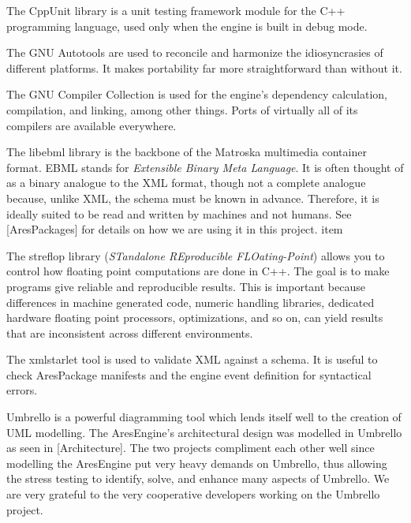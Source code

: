 
\startitemize[4]
\setupwhitespace[big]

The CppUnit library is a unit testing framework module for the C++ programming language, used only when the engine is built in debug mode.


The GNU Autotools are used to reconcile and harmonize the idiosyncrasies of different platforms. It makes portability far more straightforward than without it.


The GNU Compiler Collection is used for the engine's dependency calculation, compilation, and linking, among other things. Ports of virtually all of its compilers are available everywhere.


The libebml library is the backbone of the Matroska multimedia container format. EBML stands for {\it Extensible Binary Meta Language}. It is often thought of as a binary analogue to the XML format, though not a complete analogue because, unlike XML, the schema must be known in advance. Therefore, it is ideally suited to be read and written by machines and not humans. See [AresPackages] for details on how we are using it in this project.
item

The streflop library ({\it STandalone REproducible FLOating-Point}) allows you to control how floating point computations are done in C++. The goal is to make programs give reliable and reproducible results. This is important because differences in machine generated code, numeric handling libraries, dedicated hardware floating point processors, optimizations, and so on, can yield results that are inconsistent across different environments.


The xmlstarlet tool is used to validate XML against a schema. It is useful to check AresPackage manifests and the engine event definition for syntactical errors.


Umbrello is a powerful diagramming tool which lends itself well to the creation of UML modelling. The AresEngine's architectural design was modelled in Umbrello as seen in [Architecture]. The two projects compliment each other well since modelling the AresEngine put very heavy demands on Umbrello, thus allowing the stress testing to identify, solve, and enhance many aspects of Umbrello. We are very grateful to the very cooperative developers working on the Umbrello project.
\stopitemize


